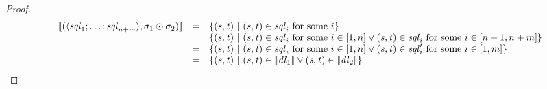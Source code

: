 \documentclass[numbers,10pt,preprint\ifanon ,nocopyrightspace\fi]{sigplanconf}
\begin{document}
\begin{proof}
  \[
    \begin{array}{rcl}
      [ \! [(\langle\mathit{sql}_1;\ldots;\mathit{sql}_{n+m}\rangle,
      \sigma_1\odot\sigma_2)] \! ]
      & = & \{(\mathit{s},\mathit{t})~|~
            (\mathit{s},\mathit{t})\in\mathit{sql}_i\text{ for some $i$}\}\\
      & = & \{(\mathit{s},\mathit{t})~|~
            (\mathit{s},\mathit{t})\in\mathit{sql}_i
            \text{ for some $i\in[1,n]$} \vee
            (\mathit{s},\mathit{t})\in\mathit{sql}_i
            \text{ for some $i\in[n+1,n+m]$}\}\\
      & = & \{(\mathit{s},\mathit{t})~|~
            (\mathit{s},\mathit{t})\in\mathit{sql}_i
            \text{ for some $i\in[1,n]$} \vee
            (\mathit{s},\mathit{t})\in\mathit{sql}_i'
            \text{ for some $i\in[1,m]$}\}\\
      & = & \{(\mathit{s},\mathit{t}) ~|~
            (\mathit{s},\mathit{t})\in[ \! [\mathit{dl}_1] \! ]
            \vee(\mathit{s},\mathit{t})\in[ \! [\mathit{dl}_2] \! ]\}
    \end{array}
  \]

\end{proof}
\end{document}
